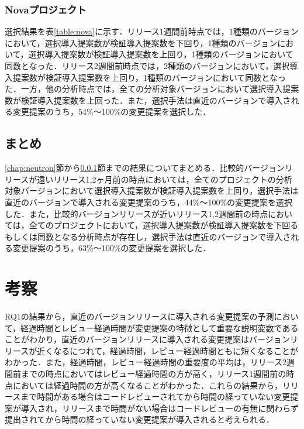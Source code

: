 \documentclass[submit,ses,noauthor]{ipsj}
\begin{document}
\subsubsection{Novaプロジェクト}\label{chap:nova}
選択結果を表\ref{table:nova}に示す．リリース1週間前時点では，1種類のバージョンにおいて，選択導入提案数が検証導入提案数を下回り，1種類のバージョンにおいて，選択導入提案数が検証導入提案数を上回り，1種類のバージョンにおいて同数となった．リリース2週間前時点では，2種類のバージョンにおいて，選択導入提案数が検証導入提案数を上回り，1種類のバージョンにおいて同数となった．一方，他の分析時点では，全ての分析対象バージョンにおいて選択導入提案数が検証導入提案数を上回った．また，選択手法は直近のバージョンで導入される変更提案のうち，54\%〜100\%の変更提案を選択した．



\subsection{まとめ}
\ref{chap:neutron}節から\ref{chap:nova}節までの結果についてまとめる．比較的バージョンリリースが遠いリリース1,2ヶ月前の時点においては，全てのプロジェクトの分析対象バージョンにおいて選択導入提案数が検証導入提案数を上回り，選択手法は直近のバージョンで導入される変更提案のうち，44\%〜100\%の変更提案を選択した．また，比較的バージョンリリースが近いリリース1,2週間前の時点においては，全てのプロジェクトにおいて，選択導入提案数が検証導入提案数を下回るもしくは同数となる分析時点が存在し，選択手法は直近のバージョンで導入される変更提案のうち，63\%〜100\%の変更提案を選択した．

\section{考察}\label{chap:disc}

RQ1の結果から，直近のバージョンリリースに導入される変更提案の予測において，経過時間とレビュー経過時間が変更提案の特徴として重要な説明変数であることがわかり，直近のバージョンリリースに導入される変更提案はバージョンリリースが近くなるにつれて，経過時間，レビュー経過時間ともに短くなることがわかった．また，経過時間，レビュー経過時間の重要度の平均は，リリース2週間前までの時点においてはレビュー経過時間の方が高く，リリース1週間前の時点においては経過時間の方が高くなることがわかった．これらの結果から，リリースまで時間がある場合はコードレビューされてから時間の経っていない変更提案が導入され，リリースまで時間がない場合はコードレビューの有無に関わらず提出されてから時間の経っていない変更提案が導入されると考えられる．
\end{document}
